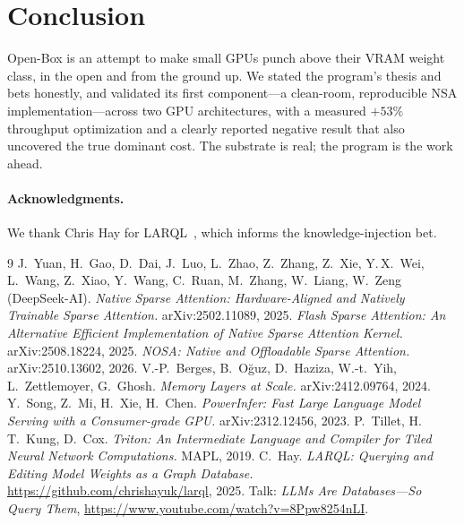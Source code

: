 \documentclass[11pt]{article}
\begin{document}
\section{Conclusion}
Open-Box is an attempt to make small GPUs punch above their VRAM weight class, in the open and from
the ground up. We stated the program's thesis and bets honestly, and validated its first
component---a clean-room, reproducible NSA implementation---across two GPU architectures, with a
measured $+53\%$ throughput optimization and a clearly reported negative result that also uncovered
the true dominant cost. The substrate is real; the program is the work ahead.

\paragraph{Acknowledgments.} We thank Chris Hay for LARQL~\cite{larql}, which informs the knowledge-injection bet.

\begin{thebibliography}{9}
 J.\ Yuan, H.\ Gao, D.\ Dai, J.\ Luo, L.\ Zhao, Z.\ Zhang, Z.\ Xie, Y.\,X.\ Wei,
L.\ Wang, Z.\ Xiao, Y.\ Wang, C.\ Ruan, M.\ Zhang, W.\ Liang, W.\ Zeng (DeepSeek-AI).
\emph{Native Sparse Attention: Hardware-Aligned and Natively Trainable Sparse Attention.}
arXiv:2502.11089, 2025.
 \emph{Flash Sparse Attention: An Alternative Efficient Implementation of Native Sparse
Attention Kernel.} arXiv:2508.18224, 2025.
 \emph{NOSA: Native and Offloadable Sparse Attention.} arXiv:2510.13602, 2026.
 V.-P.\ Berges, B.\ O\u{g}uz, D.\ Haziza, W.-t.\ Yih, L.\ Zettlemoyer, G.\ Ghosh.
\emph{Memory Layers at Scale.} arXiv:2412.09764, 2024.
 Y.\ Song, Z.\ Mi, H.\ Xie, H.\ Chen. \emph{PowerInfer: Fast Large Language
Model Serving with a Consumer-grade GPU.} arXiv:2312.12456, 2023.
 P.\ Tillet, H.\,T.\ Kung, D.\ Cox. \emph{Triton: An Intermediate Language and
Compiler for Tiled Neural Network Computations.} MAPL, 2019.
 C.\ Hay. \emph{LARQL: Querying and Editing Model Weights as a Graph Database.}
\url{https://github.com/chrishayuk/larql}, 2025. Talk: \emph{LLMs Are Databases---So Query Them},
\url{https://www.youtube.com/watch?v=8Ppw8254nLI}.
\end{thebibliography}
\end{document}
